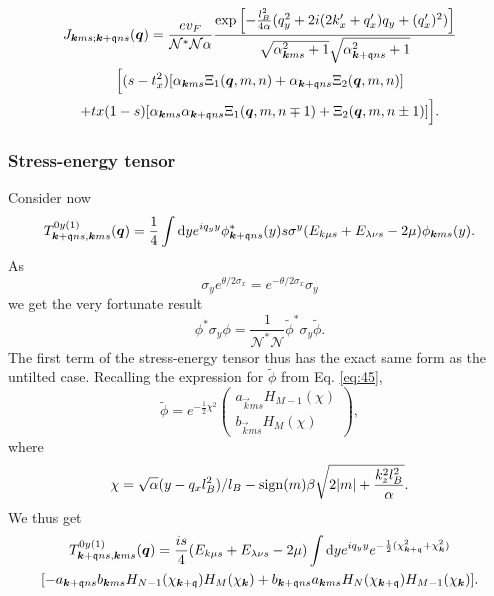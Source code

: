 \begin{multline}
  J_{\bm{k} m s; \bm{k} + \mathfrak{q} n s} (\bm{q}) =
  \frac{e v_F }{\mathcal{N}^{*} \mathcal{N} \alpha }
  \frac{
    \exp \left[
      -\frac{l_{B}^2}{4 \alpha } (q_{y}^2 + 2i (2 k' _x + q' _x) q_{y} + (q'_x)^2 )
    \right]
  }{
    \sqrt{\alpha_{\bm{k} m s}^2 + 1} \sqrt{\alpha _{\bm{k}+\mathfrak{q} n s}^2 + 1}
  }\\
  \Big[
  (s-t_x^2) [ \alpha_{\bm{k} m s} \Xi_1(\bm{q}, m, n) + \alpha_{\bm{k} + \mathfrak{q} n s} \Xi_2(\bm{q}, m, n) ]\\
  + tx(1-s) [\alpha_{\bm{k} m s} \alpha_{\bm{k} + \mathfrak{q} ns} \Xi_1(\bm{q}, m, n\mp 1)
  + \Xi_2(\bm{q}, m, n \pm 1)] \Big].
\end{multline}

\subsubsection{Stress-energy tensor}
Consider now
\begin{equation}
  \label{eq:33}
  T_{\bm{k} + \mathfrak{q} n s, \bm{k} m s}^{0y(1)} (\bm{q}) =
  \frac{1}{4}
  \int \mathrm{d} y
  e^{i q_{y} y}
  \phi ^{*}_{\bm{k} + \mathfrak{q} n s}(y) s \sigma ^{y}
  (E_{k \mu  s} + E_{\lambda \nu s} - 2 \mu)
  \phi _{\bm{k} m s} (y).
\end{equation}
As
\begin{equation}
  \label{eq:34}
  \sigma _{y} e^{\theta /2 \sigma _{x}} = e^{-\theta /2 \sigma _{x}} \sigma _{y}
\end{equation}
we get the very fortunate result
\begin{equation}
  \label{eq:35}
  \phi^{*} \sigma _{y} \phi = \frac{1}{\mathcal{N}^{*} \mathcal{N}} \tilde{\phi}^{*} \sigma _{y} \tilde{\phi}.
\end{equation}
The first term of the stress-energy tensor thus has the exact same form as the untilted case.
Recalling the expression for \(\tilde{\phi}\) from Eq. \eqref{eq:45},
\[
  \tilde{\phi} = e^{-\frac{1}{2} \chi ^2}
  \begin{pmatrix}
    a_{\vec{k} m s} H_{M-1} (\chi)\\
    b_{\vec{k} m s} H_{M} (\chi)
  \end{pmatrix},
\]
where
\[
\chi = \sqrt{\alpha} (y - q_{x} l_{B}^2 ) /l_{B} - \operatorname{sign}(m) \beta \sqrt{2 |m| + \frac{k_{z}^2 l_{B}^2}{\alpha }}.
\]
We thus get
\begin{multline}
  \label{eq:48}
  T_{\vec{k}+\qvec{q} ns, \vec{k} m s}^{0y (1)} (\vec{q}) =
  \frac{is}{4} (E_{k\mu  s} + E_{\lambda \nu s} - 2 \mu)
  \int \mathrm{d} y
  e^{i q_{y} y}
  e^{-\frac{1}{2} (\chi_{\vec{k}+\qvec{q}}^2 + \chi_{\vec{k}} ^2) }\\
  [
  -a_{\vec{k} + \qvec{q} ns} b_{\vec{k} m s} H_{N-1} (\chi_{\vec{k} + \qvec{q}}) H_{M} (\chi_{\vec{k}})
  + b_{\vec{k} + \qvec{q} n s} a_{\vec{k} ms} H_{N}(\chi_{\vec{k} + \qvec{q}}) H_{M-1} (\chi_{\vec{k}})
  ].
\end{multline}
